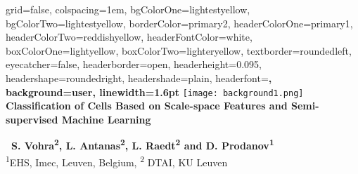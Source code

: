 \documentclass[portrait,final,a0paper]{baposter}
\begin{document}
\newlength{\leftimgwidth}
\begin{poster}%
  {
  grid=false,
  colspacing=1em,
  bgColorOne=lightestyellow,
  bgColorTwo=lightestyellow,
  borderColor=primary2,
  headerColorOne=primary1,
  headerColorTwo=reddishyellow,
  headerFontColor=white,
  boxColorOne=lightyellow,
  boxColorTwo=lighteryellow,
  textborder=roundedleft,
  eyecatcher=false,
  headerborder=open,
  headerheight=0.095\textheight,
  headershape=roundedright,
  headershade=plain,
  headerfont=\Large\sf\bf, %
  background=user,
  linewidth=1.6pt
  }
  {\texttt{[image: background1.png]}} %
  {
  \vspace{2.2em}
  \color{primary1}
  \textbf{
  Classification of Cells Based on Scale-space Features and Semi-supervised Machine Learning}
  }
  {
  \vspace{0.5em}\textbf{\ S. Vohra\textsuperscript{2}, L. Antanas\textsuperscript{2}, L. Raedt\textsuperscript{2} and D. Prodanov\textsuperscript{1}}\\
   \textsuperscript{1}EHS, Imec, Leuven, Belgium, \textsuperscript{2} DTAI, KU Leuven\\
   \vspace{1.94em}
    
  }
  {%
  }
   
    
 

\end{poster}
\end{document}
